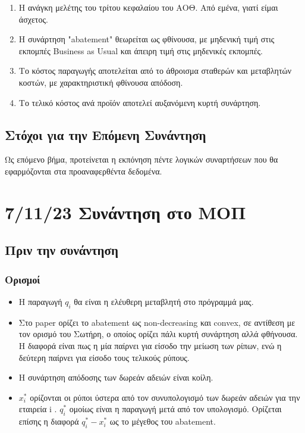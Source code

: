 \documentclass[a4paper,twoside,10pt]{article}
\begin{document}
\begin{enumerate}
	\item Η ανάγκη μελέτης του τρίτου κεφαλαίου του ΑΟΘ. Από εμένα, γιατί είμαι άσχετος.
	\item Η συνάρτηση "abatement" θεωρείται ως φθίνουσα, με μηδενική τιμή στις εκπομπές Business as Usual και άπειρη τιμή στις μηδενικές εκπομπές.
	\item Το κόστος παραγωγής αποτελείται από το άθροισμα σταθερών και μεταβλητών κοστών, με χαρακτηριστική φθίνουσα απόδοση.
	\item Το τελικό κόστος ανά προϊόν αποτελεί αυξανόμενη κυρτή συνάρτηση.
\end{enumerate}

\subsection{Στόχοι για την Επόμενη Συνάντηση}
Ως επόμενο βήμα, προτείνεται η εκπόνηση πέντε λογικών συναρτήσεων που θα εφαρμόζονται στα προαναφερθέντα δεδομένα.

\section{7/11/23 Συνάντηση στο ΜΟΠ}

\subsection{Πριν την συνάντηση}
\subsubsection{Ορισμοί}
\begin{itemize}
	\item Η παραγωγή $q_i$ θα είναι η ελέυθερη μεταβλητή στο πρόγραμμά μας.
	\item Στο paper ορίζει το abatement ως non-decreasing και convex, σε αντίθεση με τον ορισμό του Σωτήρη, ο οποίος ορίζει πάλι κυρτή συνάρτηση αλλά φθήνουσα. Η διαφορά είναι πως η μία παίρνει για είσοδο την μείωση των ρίπων, ενώ η δεύτερη παίρνει για είσοδο τους τελικούς ρύπους. 
	\item Η συνάρτηση απόδοσης των δωρεάν αδειών είναι κοίλη.
	\item $x_i^*$ ορίζονται οι ρύποι ύστερα από τον συνυπολογισμό των δωρεάν αδειών για την εταιρεία i . $q_i^*$ ομοίως είναι η παραγωγή μετά από τον υπολογισμό. Ορίζεται επίσης η διαφορά $q_i^* - x_i^*$ ως το μέγεθος του abatement. 
\end{itemize}
\end{document}
